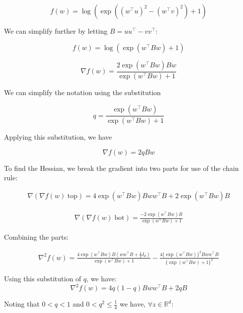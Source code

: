 \documentclass[11pt]{article}
\begin{document}
\begin{equation}
    f(w) = \log(\exp((w^{\top}u)^2 - (w^{\top}v)^2) + 1)
\end{equation}

We can simplify further by letting $B = uu^\top - vv^\top$:

\begin{equation}
\label{eq:f}
    f(w) = \log(\exp(w^{\top}Bw) + 1)
\end{equation}

\begin{equation}
    \nabla f(w) = \frac{2 \exp(w^{\top}Bw)Bw}{\exp(w^{\top}Bw) + 1}
\end{equation}

We can simplify the notation using the substitution

\begin{equation}
q = \frac{\exp(w^{\top}Bw)}{\exp(w^{\top}Bw) + 1}
\end{equation}

Applying this substitution, we have

\begin{equation}
\label{eq:grad_f}
    \nabla f(w) = 2qBw
\end{equation}

To find the Hessian, we break the gradient into two parts for use of the chain rule:

\begin{align*}
    \nabla (\nabla f(w) \; \textrm{top}) = 4 \exp(w^{\top}Bw)Bww^{\top}B  + 2 \exp(w^{\top}Bw)B
\end{align*}

\begin{align*}
    \nabla (\nabla f(w) \; \textrm{bot}) = \frac{-2 \exp(w^{\top}Bw)B}{\exp(w^{\top}Bw) + 1}
\end{align*}

Combining the parts:

\begin{align*}
    \nabla^2 f(w) = \frac{4 \exp(w^{\top}Bw)B(ww^{\top}B + \frac{1}{2}I_d)}{\exp(w^{\top}Bw) + 1} - \frac{4 \{\exp(w^{\top}Bw)\}^2 Bww^{\top}B }{\{\exp(w^{\top}Bw) + 1\}^2}
\end{align*}

Using this substitution of $q$,  we have:
\begin{equation}
    \nabla^2 f(w) = 4q(1-q)Bww^{\top}B + 2qB
\end{equation}

Noting that $0 < q < 1$ and $0 < q^2 \leq \frac{1}{4}$ we have, $\forall z \in \mathbb{R}^d$:
\end{document}
